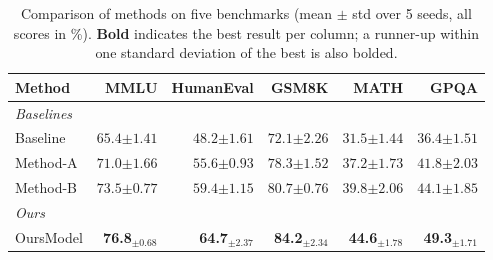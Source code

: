\documentclass[10pt]{article}
\begin{document}
\thispagestyle{empty}
\begin{table}[ht]
\centering
\small
\begin{tabular}{lrrrrr}
\toprule
\textbf{Method} & \textbf{MMLU} & \textbf{HumanEval} & \textbf{GSM8K} & \textbf{MATH} & \textbf{GPQA} \\
\midrule
\multicolumn{6}{l}{\textit{Baselines}} \\[2pt]
\quad Baseline & $65.4{{\pm 1.41}}$ & $48.2{{\pm 1.61}}$ & $72.1{{\pm 2.26}}$ & $31.5{{\pm 1.44}}$ & $36.4{{\pm 1.51}}$ \\
\quad Method-A & $71.0{{\pm 1.66}}$ & $55.6{{\pm 0.93}}$ & $78.3{{\pm 1.52}}$ & $37.2{{\pm 1.73}}$ & $41.8{{\pm 2.03}}$ \\
\quad Method-B & $73.5{{\pm 0.77}}$ & $59.4{{\pm 1.15}}$ & $80.7{{\pm 0.76}}$ & $39.8{{\pm 2.06}}$ & $44.1{{\pm 1.85}}$ \\
\midrule
\multicolumn{6}{l}{\textit{Ours}} \\[2pt]
\quad OursModel & \textbf{76.8}$_{\pm 0.68}$ & \textbf{64.7}$_{\pm 2.37}$ & \textbf{84.2}$_{\pm 2.34}$ & \textbf{44.6}$_{\pm 1.78}$ & \textbf{49.3}$_{\pm 1.71}$ \\
\bottomrule
\end{tabular}
\caption{Comparison of methods on five benchmarks (mean $\pm$ std over 5 seeds, all scores in \%). \textbf{Bold} indicates the best result per column; a runner-up within one standard deviation of the best is also bolded.}
\label{tab:main}
\end{table}
\end{document}
